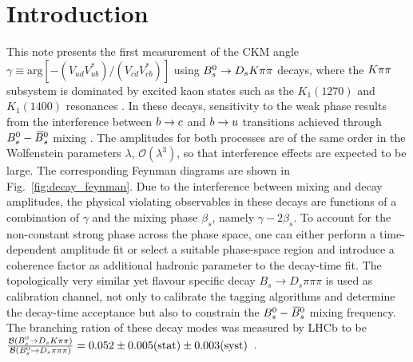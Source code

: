 
\section{Introduction}
\label{sec:Introduction}


This note presents the first measurement of the CKM angle $\gamma \equiv \text{arg}[-(V_{ud}V_{ub}^{*})/(V_{cd}V_{cb}^{*})]$ using ${{B}^0_{s}}\rightarrow{\ensuremath{{D}_{s}}}{\ensuremath{K}}\pi\pi$ decays, 
where the ${K}{\pi}{\pi}$ subsystem is dominated by excited kaon states such as the $K_{1}(1270)$ and $K_{1}(1400)$ resonances \cite{Blusk:1471393,Blusk:2012it}.
In these decays, sensitivity to the weak phase results from the
interference between ${b}\rightarrow{\ensuremath{c}}$ and ${b}\rightarrow{\ensuremath{u}}$  transitions achieved through ${{B}^0_{s}}-{{\kern 0.18em\overline{\kern -0.18em B}{}}{}^0_{s}}$ mixing \cite{Fleischer:2003yb,DeBruyn:2012jp}. 
The amplitudes for both processes are of the same order in the Wolfenstein parameters $\lambda$, $\mathcal O(\lambda^3)$, so that interference
effects are expected to be large. 
The corresponding Feynman diagrams are shown in Fig.~\ref{fig:decay_feynman}.
Due to the interference between mixing and decay amplitudes, the
physical \CP violating observables in these decays are functions of a combination of $\gamma$
and the mixing phase $\beta_s$, namely $\gamma - 2\beta_s$. 
To account for the non-constant strong phase across the phase space, 
one can either perform a time-dependent amplitude fit 
or select a suitable phase-space region and introduce a coherence factor as additional hadronic parameter to the decay-time fit.
The topologically very similar yet flavour specific decay $B_s \to D_s \pi\pi\pi$ is used as calibration channel,
not only to calibrate the tagging algorithms and determine the decay-time acceptance but also to constrain the ${{B}^0_{s}}-{{\kern 0.18em\overline{\kern -0.18em B}{}}{}^0_{s}}$ mixing frequency.
The branching ration of these decay modes was measured by LHCb to be 
$\frac{\mathcal B({{B}^0_{s}}\rightarrow{\ensuremath{{D}_{s}}}{\ensuremath{K}}\pi\pi)}{\mathcal B({{B}^0_{s}}\rightarrow{\ensuremath{{D}_{s}}}{\ensuremath{\pi}}\pi\pi)} = 0.052 \pm 0.005 (\text{stat}) \pm 0.003 (\text{syst})$~\cite{Blusk:1471393,Blusk:2012it}.



